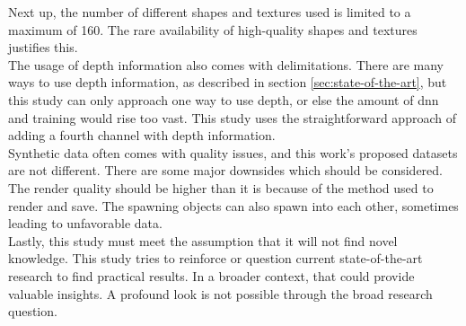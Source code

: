 		Next up, the number of different shapes and textures used is limited to a maximum of 160. The rare availability of high-quality shapes and textures justifies this.\\
		The usage of depth information also comes with delimitations. There are many ways to use depth information, as described in section \ref{sec:state-of-the-art}, but this study can only approach one way to use depth, or else the amount of \ac{dnn} and training would rise too vast. This study uses the straightforward approach of adding a fourth channel with depth information.\\
		Synthetic data often comes with quality issues, and this work's proposed datasets are not different. There are some major downsides which should be considered. The render quality should be higher than it is because of the method used to render and save. The spawning objects can also spawn into each other, sometimes leading to unfavorable data. \\
		Lastly, this study must meet the assumption that it will not find novel knowledge. This study tries to reinforce or question current state-of-the-art research to find practical results. In a broader context, that could provide valuable insights. A profound look is not possible through the broad research question.
	
	
	
